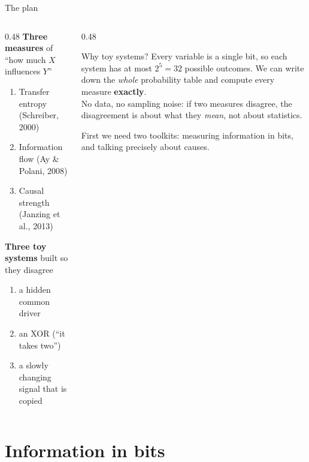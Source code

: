 \documentclass[aspectratio=169,11pt,xcolor={table}]{beamer}
\newcommand{\aside}[1]{{\color{muted}\small #1}}
\begin{document}
\begin{frame}{The plan}
  \begin{columns}[T]
    \begin{column}{0.48\textwidth}
      \textbf{Three measures} of ``how much $X$ influences $Y$''
      \begin{enumerate}
        \item Transfer entropy \aside{(Schreiber, 2000)}
        \item Information flow \aside{(Ay \& Polani, 2008)}
        \item Causal strength \aside{(Janzing et al., 2013)}
      \end{enumerate}
      \medskip
      \textbf{Three toy systems} built so they disagree
      \begin{enumerate}
        \item a hidden common driver
        \item an XOR (``it takes two'')
        \item a slowly changing signal that is copied
      \end{enumerate}
    \end{column}
    \begin{column}{0.48\textwidth}
      \begin{block}{Why toy systems?}
        Every variable is a single bit, so each system has at most $2^5 = 32$ possible outcomes.
        We can write down the \emph{whole} probability table and compute every measure
        \textbf{exactly}.\\[1mm]
        No data, no sampling noise: if two measures disagree, the disagreement is
        about what they \emph{mean}, not about statistics.
      \end{block}
      \smallskip
      \aside{First we need two toolkits: measuring information in bits, and talking precisely about causes.}
    \end{column}
  \end{columns}
\end{frame}

\section{Information in bits}
\end{document}
